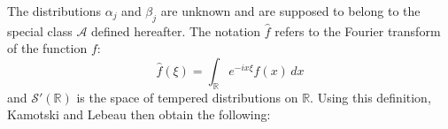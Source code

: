 The distributions $\alpha_j$ and $\beta_j$ are unknown and are supposed to belong to the special class $\mathcal{A}$ defined hereafter.
The notation $\hat{f}$ refers to the Fourier transform of the function $f$:
\begin{equation}
\hat{f}(\xi)=\int_{\mathbb{R}}e^{-ix\xi}f(x)\,dx
\label{defFouriersimple}
\end{equation}
and $\mathcal{S}'(\mathbb{R})$ is the space of tempered distributions on $\mathbb{R}$. Using this definition, Kamotski and Lebeau \cite{KamotskiLebeau} then obtain the following:
